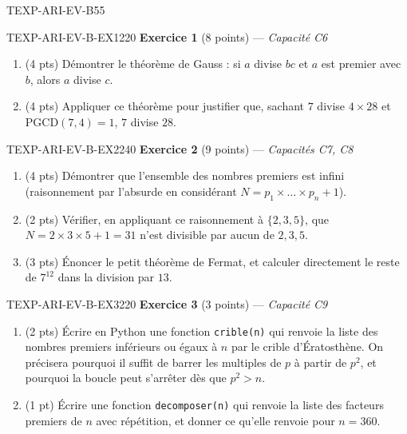 \begin{evaluation}{TEXP-ARI-EV-B}{55}

\begin{exercice}{TEXP-ARI-EV-B-EX1}{2}{20}
\textbf{Exercice 1} (8 points) --- \textit{Capacité C6}

\medskip

\begin{enumerate}
  \item (4 pts) Démontrer le théorème de Gauss : si $a$ divise $bc$ et $a$ est premier avec $b$, alors $a$ divise $c$.
  \item (4 pts) Appliquer ce théorème pour justifier que, sachant $7$ divise $4\times28$ et $\mathrm{PGCD}(7,4)=1$, $7$ divise $28$.
\end{enumerate}
\end{exercice}

\begin{exercice}{TEXP-ARI-EV-B-EX2}{2}{40}
\textbf{Exercice 2} (9 points) --- \textit{Capacités C7, C8}

\medskip

\begin{enumerate}
  \item (4 pts) Démontrer que l'ensemble des nombres premiers est infini (raisonnement par l'absurde en considérant $N=p_1\times\dots\times p_n+1$).
  \item (2 pts) Vérifier, en appliquant ce raisonnement à $\{2,3,5\}$, que $N=2\times3\times5+1=31$ n'est divisible par aucun de $2,3,5$.
  \item (3 pts) Énoncer le petit théorème de Fermat, et calculer directement le reste de $7^{12}$ dans la division par $13$.
\end{enumerate}
\end{exercice}

\begin{exercice}{TEXP-ARI-EV-B-EX3}{2}{20}
\textbf{Exercice 3} (3 points) --- \textit{Capacité C9}

\medskip

\begin{enumerate}
  \item (2 pts) Écrire en Python une fonction \texttt{crible(n)} qui renvoie la liste des nombres premiers inférieurs ou égaux à $n$ par le crible d'Ératosthène. On précisera pourquoi il suffit de barrer les multiples de $p$ à partir de $p^2$, et pourquoi la boucle peut s'arrêter dès que $p^2>n$.
  \item (1 pt) Écrire une fonction \texttt{decomposer(n)} qui renvoie la liste des facteurs premiers de $n$ avec répétition, et donner ce qu'elle renvoie pour $n=360$.
\end{enumerate}
\end{exercice}

\end{evaluation}
